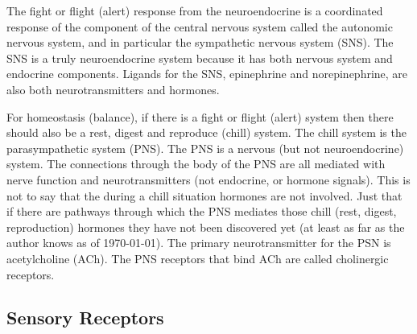 The fight or flight (alert) response from the neuroendocrine is a coordinated response of the component of the central nervous system called the autonomic nervous system, and in particular the sympathetic nervous system (SNS). The SNS is a truly neuroendocrine system because it has both nervous system and endocrine components. Ligands for the SNS, epinephrine and norepinephrine, are also both neurotransmitters and hormones.

For homeostasis (balance), if there is a fight or flight (alert) system then there should also be a rest, digest and reproduce (chill) system. The chill system is the parasympathetic system (PNS). The PNS is a nervous (but not neuroendocrine) system. The connections through the body of the PNS are all mediated with nerve function and neurotransmitters (not endocrine, or hormone signals). This is not to say that the during a chill situation hormones are not involved. Just that if there are pathways through which the PNS mediates those chill (rest, digest, reproduction) hormones they have not been discovered yet (at least as far as the author knows as of \today). The primary neurotransmitter for the PSN is acetylcholine (ACh). The PNS receptors that bind ACh are called cholinergic receptors. 

\subsection{Sensory Receptors}

